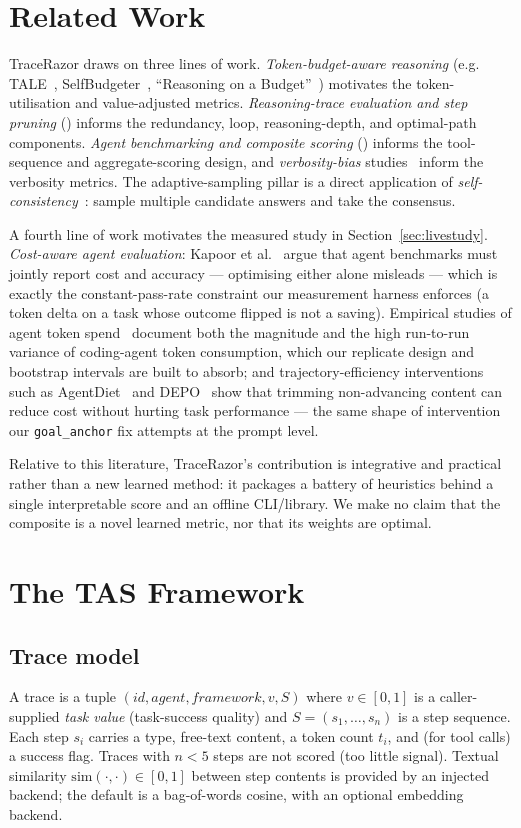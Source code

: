\documentclass[11pt]{article}
\newcommand{\code}[1]{\texttt{#1}}
\begin{document}
\section{Related Work}
TraceRazor draws on three lines of work. \emph{Token-budget-aware reasoning}
(e.g. TALE~\cite{tale}, SelfBudgeter~\cite{selfbudgeter}, ``Reasoning on a
Budget''~\cite{budget}) motivates the token-utilisation and value-adjusted
metrics. \emph{Reasoning-trace evaluation and step pruning}
(\cite{stepsurvey,steppruner,dualformer,efficientsurvey}) informs the
redundancy, loop, reasoning-depth, and optimal-path components. \emph{Agent
benchmarking and composite scoring} (\cite{toolchain,agenteval}) informs the
tool-sequence and aggregate-scoring design, and \emph{verbosity-bias}
studies~\cite{verbosity} inform the verbosity metrics. The adaptive-sampling
pillar is a direct application of \emph{self-consistency}~\cite{selfconsistency}:
sample multiple candidate answers and take the consensus.

A fourth line of work motivates the measured study in
Section~\ref{sec:livestudy}. \emph{Cost-aware agent evaluation}: Kapoor et
al.~\cite{agentsmatter} argue that agent benchmarks must jointly report cost
and accuracy --- optimising either alone misleads --- which is exactly the
constant-pass-rate constraint our measurement harness enforces (a token delta
on a task whose outcome flipped is not a saving). Empirical studies of agent
token spend~\cite{spendmoney,tokenomics} document both the magnitude and the
high run-to-run variance of coding-agent token consumption, which our
replicate design and bootstrap intervals are built to absorb; and
trajectory-efficiency interventions such as AgentDiet~\cite{agentdiet} and
DEPO~\cite{depo} show that trimming non-advancing content can reduce cost
without hurting task performance --- the same shape of intervention our
\code{goal\_anchor} fix attempts at the prompt level.

Relative to this literature, TraceRazor's contribution is integrative and
practical rather than a new learned method: it packages a battery of heuristics
behind a single interpretable score and an offline CLI/library. We make no claim
that the composite is a novel learned metric, nor that its weights are optimal.

\section{The TAS Framework}
\label{sec:tas}

\subsection{Trace model}
A trace is a tuple $(\textit{id}, \textit{agent}, \textit{framework},
v, S)$ where $v \in [0,1]$ is a caller-supplied \emph{task value} (task-success
quality) and $S = (s_1,\dots,s_n)$ is a step sequence. Each step $s_i$ carries a
type, free-text content, a token count $t_i$, and (for tool calls) a success
flag. Traces with $n < 5$ steps are not scored (too little signal). Textual
similarity $\mathrm{sim}(\cdot,\cdot)\in[0,1]$ between step contents is provided
by an injected backend; the default is a bag-of-words cosine, with an optional
embedding backend.
\end{document}
